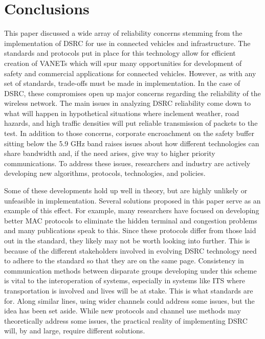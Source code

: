 \documentclass[twoside,conference]{IEEEtran}
\begin{document}
\section{Conclusions}\label{sec:conclusions}
	This paper discussed a wide array of reliability concerns stemming from the implementation of DSRC for use in connected vehicles and infrastructure. The standards and protocols put in place for this technology allow for efficient creation of VANETs which will spur many opportunities for development of safety and commercial applications for connected vehicles. However, as with any set of standards, trade-offs must be made in implementation. In the case of DSRC, these compromises open up major concerns regarding the reliability of the wireless network. The main issues in analyzing DSRC reliability come down to what will happen in hypothetical situations where inclement weather, road hazards, and high traffic densities will put reliable transmission of packets to the test. In addition to those concerns, corporate encroachment on the safety buffer sitting below the 5.9 GHz band raises issues about how different technologies can share bandwidth and, if the need arises, give way to higher priority communications. To address these issues, researchers and industry are actively developing new algorithms, protocols, technologies, and policies.
	
 	Some of these developments hold up well in theory, but are highly unlikely or unfeasible in implementation. Several solutions proposed in this paper serve as an example of this effect. For example, many researchers have focused on developing better MAC protocols to eliminate the hidden terminal and congestion problems and many publications speak to this. Since these protocols differ from those laid out in the standard, they likely may not be worth looking into further. This is because of the different stakeholders involved in evolving DSRC technology need to adhere to the standard so that they are on the same page. Consistency in communication methods between disparate groups developing under this scheme is vital to the interoperation of systems, especially in systems like ITS where transportation is involved and lives will be at stake. This is what standards are for. Along similar lines, using wider channels could address some issues, but the idea has been set aside.  While new protocols and channel use methods may theoretically address some issues, the practical reality of implementing DSRC will, by and large, require different solutions.
	
\end{document}
